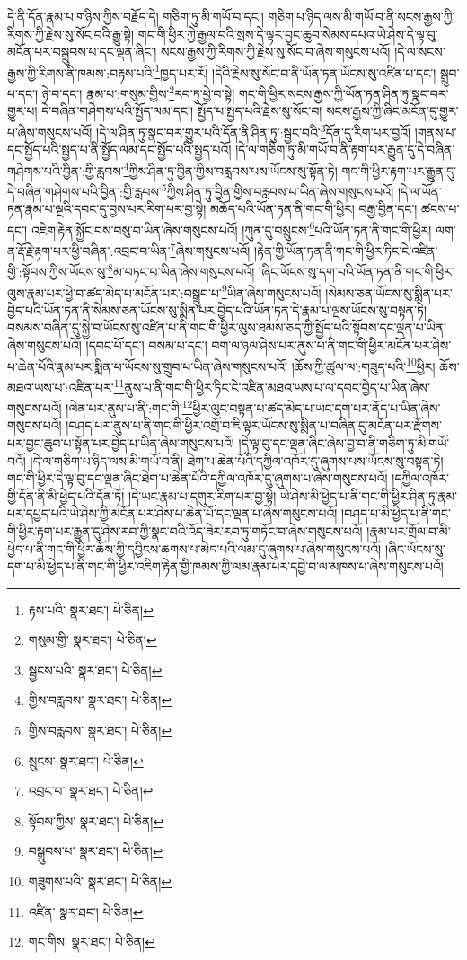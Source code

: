 དེ་ནི་དོན་རྣམ་པ་གཉིས་ཀྱིས་བརྗོད་དེ། གཅིག་ཏུ་མི་གཡོ་བ་དང་། གཅིག་པ་ཉིད་ལས་མི་གཡོ་བ་ནི་སངས་རྒྱས་ཀྱི་རིགས་ཀྱི་རྗེས་སུ་སོང་བའི་རྒྱུ་སྟེ། གང་གི་ཕྱིར་ཀྱེ་རྒྱལ་བའི་སྲས་དེ་ལྟར་བྱང་ཆུབ་སེམས་དཔའ་ཡེ་ཤེས་དེ་ལྟ་བུ་མངོན་པར་བསྒྲུབས་པ་དང་ལྡན་ཞིང་། སངས་རྒྱས་ཀྱི་རིགས་ཀྱི་རྗེས་སུ་སོང་བ་ཞེས་གསུངས་པའོ། །དེ་ལ་སངས་རྒྱས་ཀྱི་རིགས་ནི་ཁམས་:བརྟས་པའི་\footnote{རྟས་པའི་  སྣར་ཐང་།  པེ་ཅིན། }ཁྱད་པར་རོ། །དེའི་རྗེས་སུ་སོང་བ་ནི་ཡོན་ཏན་ཡོངས་སུ་འཛིན་པ་དང་། སྒྲུབ་པ་དང་། ཉེ་བ་དང་། རྣམ་པ་:གསུམ་གྱིས་\footnote{གསུམ་གྱི་  སྣར་ཐང་།  པེ་ཅིན། }རབ་ཏུ་ཕྱེ་བ་སྟེ། གང་གི་ཕྱིར་སངས་རྒྱས་ཀྱི་ཡོན་ཏན་ཤིན་ཏུ་སྣང་བར་གྱུར་པ། དེ་བཞིན་གཤེགས་པའི་སྤྱོད་ལམ་དང་། སྤྱོད་པ་སྤྱད་པའི་རྗེས་སུ་སོང་བ། སངས་རྒྱས་ཀྱི་ཞིང་མངོན་དུ་གྱུར་པ་ཞེས་གསུངས་པའོ། །དེ་ལ་ཤིན་ཏུ་སྣང་བར་གྱུར་པའི་དོན་ནི་ཤིན་ཏུ་:སྦྱང་བའི་\footnote{སྦྱངས་པའི་  སྣར་ཐང་།  པེ་ཅིན། }དོན་དུ་རིག་པར་བྱའོ། །གནས་པ་དང་སྤྱོད་པའི་སྤྱད་པ་ནི་སྤྱོད་ལམ་དང་སྤྱོད་པའི་སྤྱད་པའོ། །དེ་ལ་གཅིག་ཏུ་མི་གཡོ་བ་ནི་རྟག་པར་རྒྱུན་དུ་དེ་བཞིན་གཤེགས་པའི་བྱིན་:གྱི་རླབས་\footnote{གྱིས་བརླབས་  སྣར་ཐང་།  པེ་ཅིན། }ཀྱིས་ཤིན་ཏུ་བྱིན་གྱིས་བརླབས་པས་ཡོངས་སུ་སྟོན་ཏེ། གང་གི་ཕྱིར་རྟག་པར་རྒྱུན་དུ་དེ་བཞིན་གཤེགས་པའི་བྱིན་:གྱི་རླབས་\footnote{གྱིས་བརླབས་  སྣར་ཐང་།  པེ་ཅིན། }ཀྱིས་ཤིན་ཏུ་བྱིན་གྱིས་བརླབས་པ་ཡིན་ཞེས་གསུངས་པའོ། །དེ་ལ་ཡོན་ཏན་རྣམ་པ་ལྔའི་དབང་དུ་བྱས་པར་རིག་པར་བྱ་སྟེ། མཆོད་པའི་ཡོན་ཏན་ནི་གང་གི་ཕྱིར། བརྒྱ་བྱིན་དང་། ཚངས་པ་དང་། འཇིག་རྟེན་སྐྱོང་བས་བསུ་བ་ཡིན་ཞེས་གསུངས་པའོ། །ཀུན་དུ་བསྲུངས་\footnote{སྲུངས་  སྣར་ཐང་།  པེ་ཅིན། }པའི་ཡོན་ཏན་ནི་གང་གི་ཕྱིར། ལག་ན་རྡོ་རྗེ་རྟག་པར་ཕྱི་བཞིན་:འབྲང་བ་ཡིན་\footnote{འབྲང་བ་  སྣར་ཐང་།  པེ་ཅིན། }ཞེས་གསུངས་པའོ། །རྟེན་གྱི་ཡོན་ཏན་ནི་གང་གི་ཕྱིར་ཏིང་ངེ་འཛིན་གྱི་:སྟོབས་ཀྱིས་ཡོངས་སུ་\footnote{སྟོབས་ཀྱིས་  སྣར་ཐང་།  པེ་ཅིན། }མ་བཏང་བ་ཡིན་ཞེས་གསུངས་པའོ། །ཞིང་ཡོངས་སུ་དག་པའི་ཡོན་ཏན་ནི་གང་གི་ཕྱིར་ལུས་རྣམ་པར་ཕྱེ་བ་ཚད་མེད་པ་མངོན་པར་:བསྒྲུབ་པ་\footnote{བསྒྲུབས་པ་  སྣར་ཐང་།  པེ་ཅིན། }ཡིན་ཞེས་གསུངས་པའོ། །སེམས་ཅན་ཡོངས་སུ་སྨིན་པར་བྱེད་པའི་ཡོན་ཏན་ནི་སེམས་ཅན་ཡོངས་སུ་སྨིན་པར་བྱེད་པའི་ཡོན་ཏན་དེ་རྣམ་པ་ལྔས་ཡོངས་སུ་བསྟན་ཏེ། བསམས་བཞིན་དུ་སྐྱེ་བ་ཡོངས་སུ་འཛིན་པ་ནི་གང་གི་ཕྱིར་ལུས་ཐམས་ཅད་ཀྱི་སྤྱོད་པའི་སྟོབས་དང་ལྡན་པ་ཡིན་ཞེས་གསུངས་པའོ། །དབང་པོ་དང་། བསམ་པ་དང་། བག་ལ་ཉལ་ཤེས་པར་ནུས་པ་ནི་གང་གི་ཕྱིར་མངོན་པར་ཤེས་པ་ཆེན་པོའི་རྣམ་པར་སྨིན་པ་ཡོངས་སུ་གྲུབ་པ་ཡིན་ཞེས་གསུངས་པའོ། །ཆོས་ཀྱི་ཚུལ་ལ་:གཟུད་པའི་\footnote{གཟུགས་པའི་  སྣར་ཐང་།  པེ་ཅིན། }ཕྱིར། ཆོས་མཐའ་ཡས་པ་:འཛིན་པར་\footnote{འཛིན་  སྣར་ཐང་།  པེ་ཅིན། }ནུས་པ་ནི་གང་གི་ཕྱིར་ཏིང་ངེ་འཛིན་མཐའ་ཡས་པ་ལ་དབང་བྱེད་པ་ཡིན་ཞེས་གསུངས་པའོ། །ལེན་པར་ནུས་པ་ནི་:གང་གི་\footnote{གང་གིས་  སྣར་ཐང་།  པེ་ཅིན། }ཕྱིར་ལུང་བསྟན་པ་ཚད་མེད་པ་ཡང་དག་པར་ནོད་པ་ཡིན་ཞེས་གསུངས་པའོ། །བཤད་པར་ནུས་པ་ནི་གང་གི་ཕྱིར་འགྲོ་བ་ཇི་ལྟར་ཡོངས་སུ་སྨིན་པ་བཞིན་དུ་མངོན་པར་རྫོགས་པར་བྱང་ཆུབ་པ་སྟོན་པར་བྱེད་པ་ཡིན་ཞེས་གསུངས་པའོ། །དེ་ལྟ་བུ་དང་ལྡན་ཞིང་ཞེས་བྱ་བ་ནི་གཅིག་ཏུ་མི་གཡོ་བའོ། །དེ་ལ་གཅིག་པ་ཉིད་ལས་མི་གཡོ་བ་ནི། ཐེག་པ་ཆེན་པོའི་དཀྱིལ་འཁོར་དུ་ཞུགས་པས་ཡོངས་སུ་བསྟན་ཏེ། གང་གི་ཕྱིར་དེ་ལྟ་བུ་དང་ལྡན་ཞིང་ཐེག་པ་ཆེན་པོའི་དཀྱིལ་འཁོར་དུ་ཞུགས་པ་ཞེས་གསུངས་པའོ། །དཀྱིལ་འཁོར་གྱི་དོན་ནི་མི་ཕྱེད་པའི་དོན་ཏོ། །དེ་ཡང་རྣམ་པ་དགུར་རིག་པར་བྱ་སྟེ། ཡེ་ཤེས་མི་ཕྱེད་པ་ནི་གང་གི་ཕྱིར་ཤིན་ཏུ་རྣམ་པར་དཔྱད་པའི་ཡེ་ཤེས་ཀྱི་མངོན་པར་ཤེས་པ་ཆེན་པོ་དང་ལྡན་པ་ཞེས་གསུངས་པའོ། །བཤད་པ་མི་ཕྱེད་པ་ནི་གང་གི་ཕྱིར་རྟག་པར་རྒྱུན་དུ་ཤེས་རབ་ཀྱི་སྣང་བའི་འོད་ཟེར་རབ་ཏུ་གཏོང་བ་ཞེས་གསུངས་པའོ། །རྣམ་པར་གྲོལ་བ་མི་ཕྱེད་པ་ནི་གང་གི་ཕྱིར་ཆོས་ཀྱི་དབྱིངས་ཆགས་པ་མེད་པའི་ལམ་དུ་ཞུགས་པ་ཞེས་གསུངས་པའོ། །ཞིང་ཡོངས་སུ་དག་པ་མི་ཕྱེད་པ་ནི་གང་གི་ཕྱིར་འཇིག་རྟེན་གྱི་ཁམས་ཀྱི་ལམ་རྣམ་པར་དབྱེ་བ་ལ་མཁས་པ་ཞེས་གསུངས་པའོ། 
